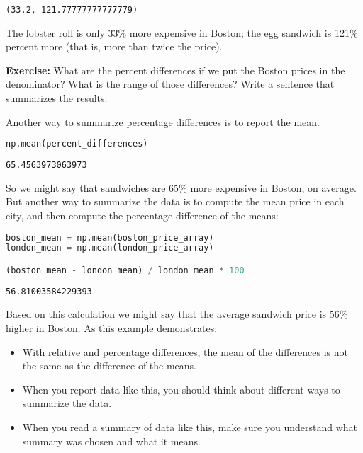 \documentclass[
]{book}
\begin{document}
\begin{lstlisting}
(33.2, 121.77777777777779)
\end{lstlisting}

The lobster roll is only 33\% more expensive in Boston; the egg sandwich
is 121\% percent more (that is, more than twice the price).

\textbf{Exercise:} What are the percent differences if we put the Boston
prices in the denominator? What is the range of those differences? Write
a sentence that summarizes the results.

Another way to summarize percentage differences is to report the mean.

\begin{lstlisting}[language=Python]
np.mean(percent_differences)
\end{lstlisting}

\begin{lstlisting}
65.4563973063973
\end{lstlisting}

So we might say that sandwiches are 65\% more expensive in Boston, on
average. But another way to summarize the data is to compute the mean
price in each city, and then compute the percentage difference of the
means:

\begin{lstlisting}[language=Python]
boston_mean = np.mean(boston_price_array)
london_mean = np.mean(london_price_array)

(boston_mean - london_mean) / london_mean * 100
\end{lstlisting}

\begin{lstlisting}
56.81003584229393
\end{lstlisting}

Based on this calculation we might say that the average sandwich price
is 56\% higher in Boston. As this example demonstrates:

\begin{itemize}
\item
  With relative and percentage differences, the mean of the differences
  is not the same as the difference of the means.
\item
  When you report data like this, you should think about different ways
  to summarize the data.
\item
  When you read a summary of data like this, make sure you understand
  what summary was chosen and what it means.
\end{itemize}
\end{document}
